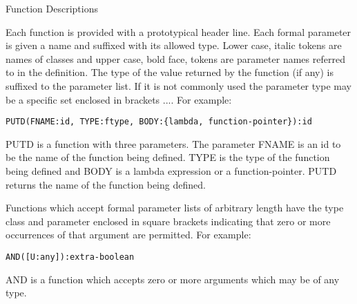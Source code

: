 \begin{Introduction}{Function Descriptions}

Each function is provided with a prototypical header line. Each formal
parameter is given a name and suffixed with its allowed type.  Lower
case, italic tokens are names of classes and upper case, bold face,
tokens are parameter names referred to in the definition. The type of
the value returned by the function (if any) is suffixed to the
parameter list. 
If it is  not commonly used the parameter  type
may be a specific set enclosed in brackets {...}.  For example:

\begin{verbatim}
PUTD(FNAME:id, TYPE:ftype, BODY:{lambda, function-pointer}):id
\end{verbatim}

PUTD is  a function with three  parameters.   The parameter FNAME  is
an id  to be the  name of the function  being defined.   TYPE is  the
type of the  function being defined and  BODY is a lambda  expression
or a function-pointer.   PUTD returns the name of the function  being
defined.

Functions which  accept formal  parameter lists  of arbitrary  length
have  the  type  class and  parameter  enclosed  in  square  brackets
indicating  that  zero  or more  occurrences  of  that  argument  are
permitted.  For example:

\begin{verbatim}
AND([U:any]):extra-boolean
\end{verbatim}

AND is a function  which accepts zero or more arguments which may  be
of any type.
\end{Introduction}

